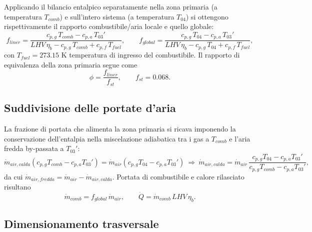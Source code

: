 Applicando il bilancio entalpico separatamente nella zona primaria (a temperatura $T_{comb}$) e sull'intero sistema (a temperatura $T_{04}$) si ottengono rispettivamente il rapporto combustibile/aria locale e quello globale:
\begin{equation*}
    f_{liner} = \frac{c_{p,g}\,T_{comb} - c_{p,a}\,T_{03}'}{LHV\,\eta_b - c_{p,g}\,T_{comb} + c_{p,f}\,T_{fuel}}, \qquad
    f_{global} = \frac{c_{p,g}\,T_{04} - c_{p,a}\,T_{03}'}{LHV\,\eta_b - c_{p,g}\,T_{04} + c_{p,f}\,T_{fuel}},
\end{equation*}
con $T_{fuel} = 273.15$ K temperatura di ingresso del combustibile. Il rapporto di equivalenza della zona primaria segue come
\begin{equation*}
    \phi = \frac{f_{liner}}{f_{st}}, \qquad f_{st} = 0.068.
\end{equation*}

\subsection{Suddivisione delle portate d'aria}

La frazione di portata che alimenta la zona primaria si ricava imponendo la conservazione dell'entalpia nella miscelazione adiabatica tra i gas a $T_{comb}$ e l'aria fredda by-passata a $T_{03}'$:
\begin{equation*}
    \dot{m}_{air,calda}\left(c_{p,g}T_{comb} - c_{p,a}T_{03}'\right) = \dot{m}_{air}\left(c_{p,g}T_{04} - c_{p,a}T_{03}'\right)
    \ \Longrightarrow \
    \dot{m}_{air,calda} = \dot{m}_{air}\,\frac{c_{p,g}T_{04} - c_{p,a}T_{03}'}{c_{p,g}T_{comb} - c_{p,a}T_{03}'},
\end{equation*}
da cui $\dot{m}_{air,fredda} = \dot{m}_{air} - \dot{m}_{air,calda}$. Portata di combustibile e calore rilasciato risultano
\begin{equation*}
    \dot{m}_{comb} = f_{global}\,\dot{m}_{air}, \qquad \dot{Q} = \dot{m}_{comb}\,LHV\,\eta_b.
\end{equation*}

\subsection{Dimensionamento trasversale}

